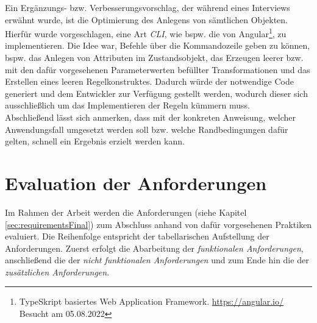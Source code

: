         Ein Ergänzungs- bzw. Verbesserungsvorschlag, der während eines Interviews erwähnt wurde, ist die Optimierung des Anlegens von sämtlichen Objekten. 
        Hierfür wurde vorgeschlagen, eine Art \textit{\ac{CLI}}, wie bspw. die von Angular\footnote{TypeSkript basiertes Web Application Framework. \url{https://angular.io/} Besucht am 05.08.2022}, 
        zu implementieren. Die Idee war, Befehle über die Kommandozeile geben zu können, bspw. das Anlegen von Attributen im Zustandsobjekt, das Erzeugen leerer bzw. mit den dafür 
        vorgesehenen Parameterwerten befüllter Transformationen und das Erstellen eines leeren Regelkonstruktes. Dadurch würde der notwendige Code generiert und dem Entwickler zur Verfügung gestellt werden, wodurch dieser 
        sich ausschließlich um das Implementieren der Regeln kümmern muss. 
        \\ 
        \linebreak
        Abschließend lässt sich anmerken, dass mit der konkreten Anweisung, welcher Anwendungsfall umgesetzt werden soll bzw. welche Randbedingungen 
        dafür gelten, schnell ein Ergebnis erzielt werden kann. 
        
\section{Evaluation der Anforderungen}
    Im Rahmen der Arbeit werden die Anforderungen (siehe Kapitel \ref{sec:requirementsFinal}) zum Abschluss anhand von dafür vorgesehenen Praktiken evaluiert. 
    Die Reihenfolge entspricht der tabellarischen Aufstellung der Anforderungen. Zuerst erfolgt die Abarbeitung der \textit{funktionalen Anforderungen}, 
    anschließend die der \textit{nicht funktionalen Anforderungen} und zum Ende hin die der \textit{zusätzlichen Anforderungen}. 
    
